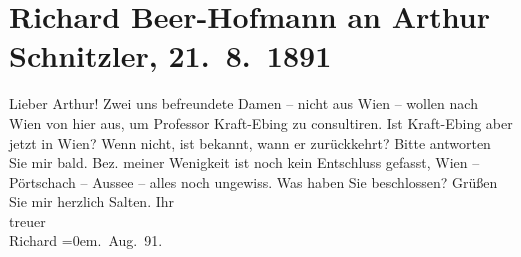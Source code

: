 

         
         \renewcommand{\erwaehntePersonen}{Personen:  ?? [Befreundete Frau 1],  ?? [Befreundete Frau 2], Richard von Krafft-Ebing, Felix Salten}
         \renewcommand{\erwaehnteOrte}{Orte: Bad Aussee, Pörtschach, Wien}
         \renewcommand{\erwaehnteWerke}{}
               \section[Richard Beer-Hofmann an Arthur Schnitzler, 21. 8. 1891]{ Richard Beer-Hofmann an Arthur Schnitzler, 21. 8. 1891}\nopagebreak{}\rehead{ }\begin{ledgroupsized}[t]{13cm}\normalsize\beginnumbering \toendnotes[C]{\smallbreak\pagebreak[2]} 
\toendnotes[C]{\smallbreak}\pstart\center{}{\pb}Lieber Arthur!\pend\pstart
           Zwei uns befreundete Damen – nicht aus Wien – wollen nach Wien von hier aus, um Professor Kraft-Ebing zu consultiren. Ist Kraft-Ebing aber jetzt in Wien? Wenn nicht,
               ist bekannt, wann er zurückkehrt? Bitte antworten Sie mir bald. Bez. meiner Wenigkeit
               ist noch kein Entschluss gefasst, Wien – Pörtschach – Aussee – alles noch ungewiss.\pend
           \pstart
           {\pb}Was haben Sie beschlossen?\pend
           \pstart
           Grüßen Sie mir herzlich Salten.\pend
           \pstart
           Ihr{\\[\baselineskip]}treuer{\\[\baselineskip]}\spacefill\mbox{Richard}\pend
           \leftskip=0em{}. Aug. 91.\pend
           
         
         \endnumbering{}\end{ledgroupsized}  \newcommand{\dateiname}{L00035}\newcommand{\titel}{Richard Beer-Hofmann an Arthur Schnitzler, 21. 8. 1891}\newcommand{\editorInnen}{Martin Anton Müller und Gerd-Hermann Susen}
      
